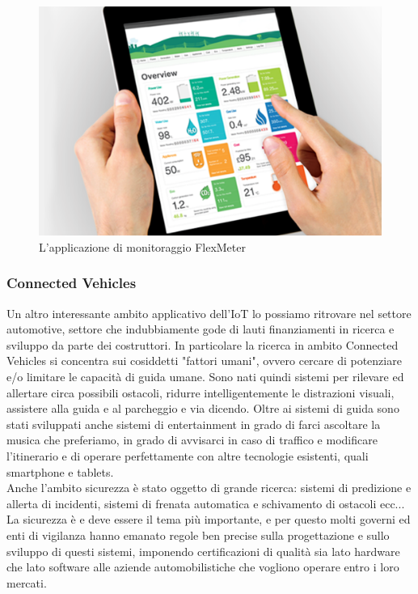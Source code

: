 \begin{figure}[H]
\centering
\includegraphics[scale=0.50]{immagini/Smart-Meter.png}
\caption{L'applicazione di monitoraggio FlexMeter}
\end{figure}

\subsubsection{Connected Vehicles}
Un altro interessante ambito applicativo dell'IoT lo possiamo ritrovare nel settore automotive, settore che indubbiamente gode di lauti finanziamenti in ricerca e sviluppo da parte dei costruttori. In particolare la ricerca in ambito Connected Vehicles si concentra sui cosiddetti "fattori umani", ovvero cercare di potenziare e/o limitare le capacità di guida umane. Sono nati quindi sistemi per rilevare ed allertare circa possibili ostacoli, ridurre intelligentemente le distrazioni visuali, assistere alla guida e al parcheggio e via dicendo.
Oltre ai sistemi di guida sono stati sviluppati anche sistemi di entertainment in grado di farci ascoltare la musica che preferiamo, in grado di avvisarci in caso di traffico e modificare l'itinerario e di operare perfettamente con altre tecnologie esistenti, quali smartphone e tablets.
\\Anche l'ambito sicurezza è stato oggetto di grande ricerca: sistemi di predizione e allerta di incidenti, sistemi di frenata automatica e schivamento di ostacoli ecc...
\\La sicurezza è e deve essere il tema più importante, e per questo molti governi ed enti di vigilanza hanno emanato regole ben precise sulla progettazione e sullo sviluppo di questi sistemi, imponendo certificazioni di qualità sia lato hardware che lato software alle aziende automobilistiche che vogliono operare entro i loro mercati.


